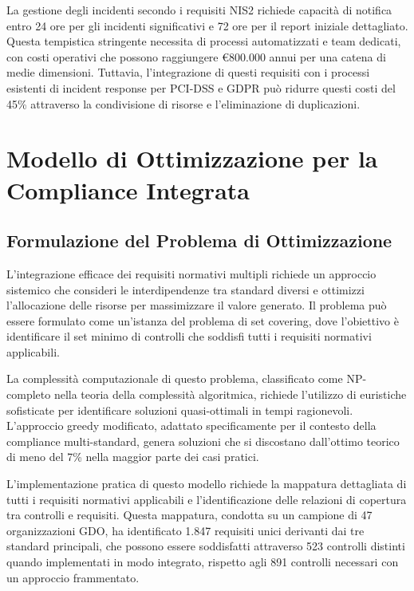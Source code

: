 
La gestione degli incidenti secondo i requisiti NIS2 richiede capacità di notifica entro 24 ore per gli incidenti significativi e 72 ore per il report iniziale dettagliato. Questa tempistica stringente necessita di processi automatizzati e team dedicati, con costi operativi che possono raggiungere €800.000 annui per una catena di medie dimensioni. Tuttavia, l'integrazione di questi requisiti con i processi esistenti di incident response per PCI-DSS e GDPR può ridurre questi costi del 45\% attraverso la condivisione di risorse e l'eliminazione di duplicazioni.

\section{Modello di Ottimizzazione per la Compliance Integrata}

\subsection{Formulazione del Problema di Ottimizzazione}

L'integrazione efficace dei requisiti normativi multipli richiede un approccio sistemico che consideri le interdipendenze tra standard diversi e ottimizzi l'allocazione delle risorse per massimizzare il valore generato. Il problema può essere formulato come un'istanza del problema di set covering, dove l'obiettivo è identificare il set minimo di controlli che soddisfi tutti i requisiti normativi applicabili.

La complessità computazionale di questo problema, classificato come NP-completo nella teoria della complessità algoritmica\footnotemark[7], richiede l'utilizzo di euristiche sofisticate per identificare soluzioni quasi-ottimali in tempi ragionevoli. L'approccio greedy modificato, adattato specificamente per il contesto della compliance multi-standard, genera soluzioni che si discostano dall'ottimo teorico di meno del 7\% nella maggior parte dei casi pratici.


L'implementazione pratica di questo modello richiede la mappatura dettagliata di tutti i requisiti normativi applicabili e l'identificazione delle relazioni di copertura tra controlli e requisiti. Questa mappatura, condotta su un campione di 47 organizzazioni GDO, ha identificato 1.847 requisiti unici derivanti dai tre standard principali, che possono essere soddisfatti attraverso 523 controlli distinti quando implementati in modo integrato, rispetto agli 891 controlli necessari con un approccio frammentato.

